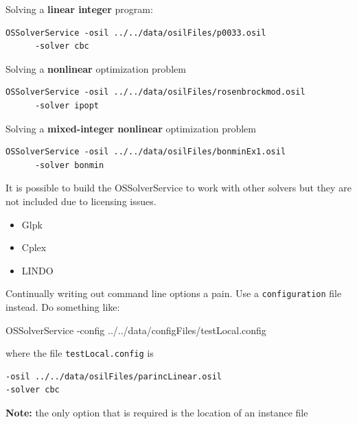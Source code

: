 \documentclass[11pt]{article}
\renewcommand{\_}{{\char"5F}}
\renewcommand{\{}{{\char"7B}}
\renewcommand{\}}{{\char"7D}}
\renewcommand{\^}{{\char"0D}}
\renewcommand{\'}{{\char"0D}}
\begin{document}
Solving a {\bf linear integer} program:



\vfill

{\small
\begin{verbatim}
OSSolverService -osil ../../data/osilFiles/p0033.osil 
      -solver cbc
\end{verbatim}
}

\vfill

Solving a {\bf nonlinear} optimization problem

{\small
\begin{verbatim}
OSSolverService -osil ../../data/osilFiles/rosenbrockmod.osil 
      -solver ipopt
\end{verbatim}
}

\vfill

Solving a {\bf mixed-integer nonlinear} optimization problem

{\small
\begin{verbatim}
OSSolverService -osil ../../data/osilFiles/bonminEx1.osil 
      -solver bonmin
\end{verbatim}
}



It is possible to build the OSSolverService to work with other solvers but they are not included due to licensing issues.


\begin{itemize}

\vfill \item Glpk 

\vfill \item Cplex 

\vfill \item LINDO

\end{itemize}




Continually writing out command line options a pain. Use a {\tt configuration} file instead.
Do something like:

\vfill

OSSolverService -config  ../../data/configFiles/testLocal.config

\vfill
where the file {\tt testLocal.config} is

\vfill

\begin{verbatim}
-osil ../../data/osilFiles/parincLinear.osil
-solver cbc
\end{verbatim}

\vfill
{\bf Note:} the only option that is required is the location of an instance file
\end{document}
